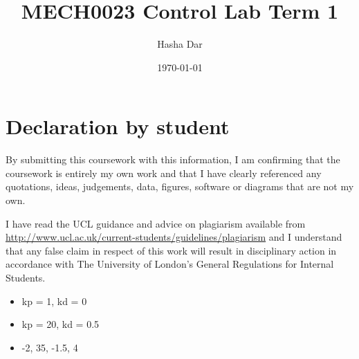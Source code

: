 \documentclass{article}
\begin{document}
\title{MECH0023 Control Lab Term 1}
\author{Hasha Dar}
\date{\today}
\maketitle
\section*{Declaration by student}
By submitting this coursework with this information, I am confirming that the coursework is entirely my own work and that I have clearly referenced any quotations, ideas, judgements, data, figures, software or diagrams that are not my own.

I have read the UCL guidance and advice on plagiarism available from \url{http://www.ucl.ac.uk/current-students/guidelines/plagiarism} and I understand that any false claim in respect of this work will result in disciplinary action in accordance with The University of London's General Regulations for Internal Students.

\begin{itemize}
    \item kp = 1, kd = 0
    \item kp = 20, kd = 0.5
\end{itemize}
\begin{itemize}
    \item -2, 35, -1.5, 4
\end{itemize}
\end{document}
